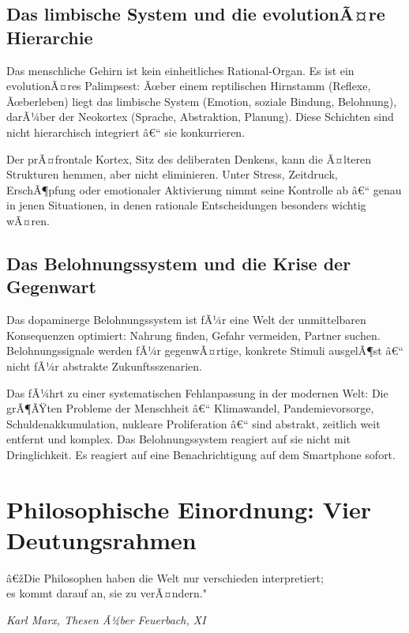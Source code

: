 ﻿\documentclass[12pt, a4paper]{article}
\begin{document}
\subsection{Das limbische System und die evolutionÃ¤re Hierarchie}

Das menschliche Gehirn ist kein einheitliches Rational-Organ. Es ist ein
evolutionÃ¤res Palimpsest: Ãœber einem reptilischen Hirnstamm (Reflexe, Ãœberleben)
liegt das limbische System (Emotion, soziale Bindung, Belohnung), darÃ¼ber der
Neokortex (Sprache, Abstraktion, Planung). Diese Schichten sind nicht hierarchisch
integriert â€“ sie konkurrieren.

Der prÃ¤frontale Kortex, Sitz des deliberaten Denkens, kann die Ã¤lteren Strukturen
hemmen, aber nicht eliminieren. Unter Stress, Zeitdruck, ErschÃ¶pfung oder
emotionaler Aktivierung nimmt seine Kontrolle ab â€“ genau in jenen Situationen,
in denen rationale Entscheidungen besonders wichtig wÃ¤ren.

\subsection{Das Belohnungssystem und die Krise der Gegenwart}

Das dopaminerge Belohnungssystem ist fÃ¼r eine Welt der unmittelbaren Konsequenzen
optimiert: Nahrung finden, Gefahr vermeiden, Partner suchen. Belohnungssignale
werden fÃ¼r gegenwÃ¤rtige, konkrete Stimuli ausgelÃ¶st â€“ nicht fÃ¼r abstrakte
Zukunftsszenarien.

Das fÃ¼hrt zu einer systematischen Fehlanpassung in der modernen Welt:
Die grÃ¶ÃŸten Probleme der Menschheit â€“ Klimawandel, Pandemievorsorge,
Schuldenakkumulation, nukleare Proliferation â€“ sind abstrakt, zeitlich weit
entfernt und komplex. Das Belohnungssystem reagiert auf sie nicht mit Dringlichkeit.
Es reagiert auf eine Benachrichtigung auf dem Smartphone sofort.

\section{Philosophische Einordnung: Vier Deutungsrahmen}

\epigraph{â€žDie Philosophen haben die Welt nur verschieden interpretiert;\\
es kommt darauf an, sie zu verÃ¤ndern."}{\textit{Karl Marx, Thesen Ã¼ber Feuerbach, XI}}
\end{document}
